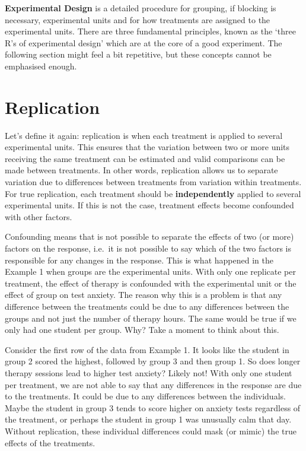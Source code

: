 \documentclass[
  letterpaper,
]{book}
\begin{document}
\textbf{Experimental Design} is a detailed procedure for grouping, if
blocking is necessary, experimental units and for how treatments are
assigned to the experimental units. There are three fundamental
principles, known as the `three R's of experimental design' which are at
the core of a good experiment. The following section might feel a bit
repetitive, but these concepts cannot be emphasised enough.

\section*{Replication}\label{replication}


Let's define it again: replication is when each treatment is applied to
several experimental units. This ensures that the variation between two
or more units receiving the same treatment can be estimated and valid
comparisons can be made between treatments. In other words, replication
allows us to separate variation due to differences between treatments
from variation within treatments. For true replication, each treatment
should be \textbf{independently} applied to several experimental units.
If this is not the case, treatment effects become confounded with other
factors.

Confounding means that is not possible to separate the effects of two
(or more) factors on the response, i.e.~it is not possible to say which
of the two factors is responsible for any changes in the response. This
is what happened in the Example 1 when groups are the experimental
units. With only one replicate per treatment, the effect of therapy is
confounded with the experimental unit or the effect of group on test
anxiety. The reason why this is a problem is that any difference between
the treatments could be due to any differences between the groups and
not just the number of therapy hours. The same would be true if we only
had one student per group. Why? Take a moment to think about this.

Consider the first row of the data from Example 1. It looks like the
student in group 2 scored the highest, followed by group 3 and then
group 1. So does longer therapy sessions lead to higher test anxiety?
Likely not! With only one student per treatment, we are not able to say
that any differences in the response are due to the treatments. It could
be due to any differences between the individuals. Maybe the student in
group 3 tends to score higher on anxiety tests regardless of the
treatment, or perhaps the student in group 1 was unusually calm that
day. Without replication, these individual differences could mask (or
mimic) the true effects of the treatments.
\end{document}
